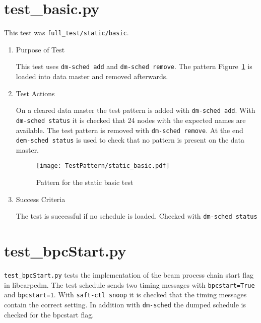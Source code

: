 \documentclass[12pt,a4paper]{report}
\begin{document}
\section{test\_basic.py}
This test was \texttt{full\_test/static/basic}.
\begin{enumerate}
	\item Purpose of Test

	This test uses \texttt{dm-sched add} and \texttt{dm-sched remove}. The pattern Figure~\ref{fig:Pattern_for_the_static_basic_test}
	is loaded into data master and removed afterwards.

	\item Test Actions

	On a cleared data master the test pattern is added with \texttt{dm-sched add}. With \texttt{dm-sched status} it is checked
	that 24 nodes with the expected names are available. The test pattern is removed with \texttt{dm-sched remove}. At the
	end \texttt{dem-sched status} is used to check that no pattern is present on the data master.

    \begin{figure}
        \centering
        \texttt{[image: TestPattern/static\_basic.pdf]}
        \caption{Pattern for the static basic test}
        \label{fig:Pattern_for_the_static_basic_test}
    \end{figure}
	\item Success Criteria

	The test is successful if no schedule is loaded. Checked with \texttt{dm-sched status}
\end{enumerate}
\section{test\_bpcStart.py}
\texttt{test\_bpcStart.py} tests the implementation of the beam process chain start flag in libcarpedm.
The test schedule sends two timing messages with \texttt{bpcstart=True} and \texttt{bpcstart=1}.
With \texttt{saft-ctl snoop} it is checked that the timing messages contain the correct setting.
In addition with \texttt{dm-sched} the dumped schedule is checked for the bpcstart flag.
\end{document}
